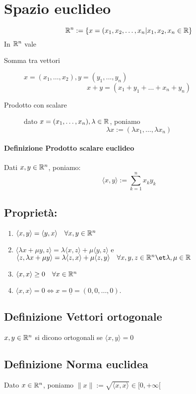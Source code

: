 \documentclass[a4paper]{article}
\begin{document}
\section{Spazio euclideo}
$$
\mathbb{R} ^ n := \{ x = (x_1, x_2, \dots , x_n | x_1, x_2, x_n \in \mathbb{R} \}
$$	
In $ \mathbb{R} ^ n $ vale 

\begin{description}
	\item [Somma tra vettori] $ x = (x_1,\dots,x_2) , y = (y_1, ... , y_n) $
		$$
		x+y=(x_1+y_1 + \dots + x_n + y_n )
		$$
	\item [Prodotto  con scalare] dato $ x=(x_1, \dots , x_n) , \lambda \in \mathbb{R} $, poniamo
		$$
		\lambda x:=( \lambda x_1, \dots , \lambda x_n )
		$$
\end{description}

\paragraph{Definizione Prodotto scalare euclideo} Dati $x , y \in \mathbb{R} ^ n $, poniamo:
$$
\langle x,y \rangle := \sum_{k=1}^n x_k y_k
$$

\subsection{ Proprietà: }

\begin{enumerate}
	\item %
		$\langle x,y \rangle = \langle y,x \rangle \quad \forall x,y \in \mathbb{R} ^n $ 

	\item %
		$ \langle \lambda x + \mu y , z \rangle = \lambda \langle x ,z \rangle + \mu \langle y,z \rangle $ e
		$ \langle z, \lambda x + \mu y \rangle = \lambda \langle z,x \rangle + \mu \langle z,y \rangle \quad \forall x,y,z \in \R ^ n \et \lambda , \mu \in \R $
		\item $ \langle x,x \rangle \ge 0 \quad \forall x \in \mathbb{R} ^ n $
		\item $ \langle x,x \rangle = 0 \iff x= \underline{0} = (0,0,\dots, 0). $
\end{enumerate}

\subsection { Definizione Vettori ortogonale} $x,y \in \mathbb{R} ^n $ si dicono ortogonali se $ \langle x,y \rangle = 0$

\subsection { Definizione Norma euclidea }
Dato $ x \in \mathbb{R} ^n $, poniamo $ \|x \| := \sqrt{\langle x,x \rangle } \in [0, + \infty [$
\end{document}

